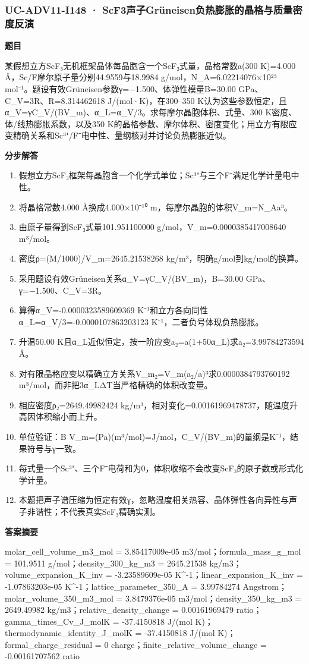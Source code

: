 \documentclass[UTF8,11pt,a4paper]{ctexart}
\begin{document}
\subsubsection*{UC-ADV11-I148 · ScF3声子Grüneisen负热膨胀的晶格与质量密度反演}
\noindent\textbf{题目}\par
某假想立方ScF₃无机框架晶体每晶胞含一个ScF₃式量，晶格常数a(300 K)=4.000 Å，Sc/F摩尔原子量分别44.9559与18.9984 g/mol，N\_A=6.02214076×10²³ mol⁻¹。题设有效Grüneisen参数γ=−1.500、体弹性模量B=30.00 GPa、C\_V=3R、R=8.314462618 J/(mol·K)，在300–350 K认为这些参数恒定，且α\_V=γC\_V/(BV\_m)、α\_L=α\_V/3。求每摩尔晶胞体积、式量、300 K密度、体/线热膨胀系数，以及350 K的晶格参数、摩尔体积、密度变化；用立方有限应变精确关系和Sc³⁺/F⁻电中性、量纲核对并讨论负热膨胀近似。\par
\medskip\noindent\textbf{分步解答}
\begin{enumerate}
\item 假想立方ScF₃框架每晶胞含一个化学式单位；Sc³⁺与三个F⁻满足化学计量电中性。
\item 将晶格常数4.000 Å换成4.000×10⁻¹⁰ m，每摩尔晶胞的体积V\_m=N\_Aa³。
\item 由原子量得到ScF₃式量101.951100000 g/mol，V\_m=0.0000385417008640 m³/mol。
\item 密度ρ=(M/1000)/V\_m=2645.21538268 kg/m³，明确g/mol到kg/mol的换算。
\item 采用题设有效Grüneisen关系α\_V=γC\_V/(BV\_m)，B=30.00 GPa、γ=−1.500、C\_V=3R。
\item 算得α\_V=-0.0000323589609369 K⁻¹和立方各向同性α\_L=α\_V/3=-0.0000107863203123 K⁻¹，二者负号体现负热膨胀。
\item 升温50.00 K且α\_L近似恒定，按一阶应变a₂=a(1+50α\_L)求a₂=3.99784273594 Å。
\item 对有限晶格应变以精确立方关系V\_m₂=V\_m(a₂/a)³求0.0000384793760192 m³/mol，而非把3α\_LΔT当严格精确的体积改变量。
\item 相应密度ρ₂=2649.49982424 kg/m³，相对变化=0.00161969478737，随温度升高因体积缩小而上升。
\item 单位验证：B V\_m=(Pa)(m³/mol)=J/mol，C\_V/(BV\_m)的量纲是K⁻¹，结果符号与γ一致。
\item 每式量一个Sc³⁺、三个F⁻电荷和为0，体积收缩不会改变ScF₃的原子数或形式化学计量。
\item 本题把声子谱压缩为恒定有效γ，忽略温度相关热容、晶体弹性各向异性与声子非谐性；不代表真实ScF₃精确实测。
\end{enumerate}
\noindent\textbf{答案摘要}\par
molar\_cell\_volume\_m3\_mol = 3.85417009e-05 m3/mol；formula\_mass\_g\_mol = 101.9511 g/mol；density\_300\_kg\_m3 = 2645.21538 kg/m3；volume\_expansion\_K\_inv = -3.23589609e-05 K\textasciicircum{}-1；linear\_expansion\_K\_inv = -1.07863203e-05 K\textasciicircum{}-1；lattice\_parameter\_350\_A = 3.99784274 Angstrom；molar\_volume\_350\_m3\_mol = 3.8479376e-05 m3/mol；density\_350\_kg\_m3 = 2649.49982 kg/m3；relative\_density\_change = 0.00161969479 ratio；gamma\_times\_Cv\_J\_molK = -37.4150818 J/(mol K)；thermodynamic\_identity\_J\_molK = -37.4150818 J/(mol K)；formal\_charge\_residual = 0 charge；finite\_relative\_volume\_change = -0.00161707562 ratio\par
\end{document}
